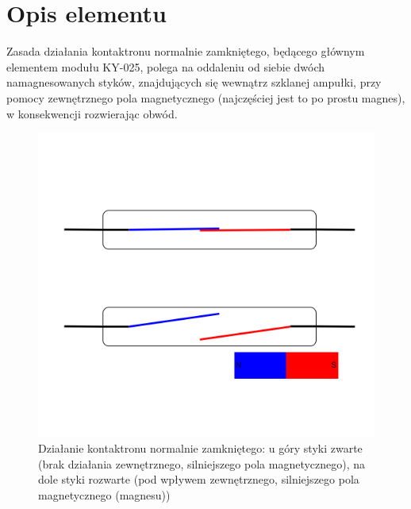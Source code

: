 \documentclass[11pt, a4paper]{article}
\institute{Instytut Robotyki i Inteligencji Maszynowej}
\begin{document}
\newpage

\section{Opis elementu} 
Zasada działania kontaktronu normalnie zamkniętego, będącego głównym elementem modułu KY-025, polega na oddaleniu od siebie dwóch namagnesowanych styków, znajdujących się wewnątrz szklanej ampułki, przy pomocy zewnętrznego pola magnetycznego (najczęściej jest to po prostu magnes), w konsekwencji rozwierając obwód. 
\vspace{0.3cm}
\begin{figure}[H]
\centering
\includegraphics[width=.7\linewidth]{fig/Kontaktron-KY-025/zasada_dzialania/zasada_dzialania.png}
\caption{Działanie kontaktronu normalnie zamkniętego: u góry styki zwarte (brak działania zewnętrznego, silniejszego pola magnetycznego), na dole styki rozwarte (pod wpływem zewnętrznego, silniejszego pola magnetycznego (magnesu))}
\label{fig:sub3}
\end{figure}
\vspace{0.3cm}
\end{document}
